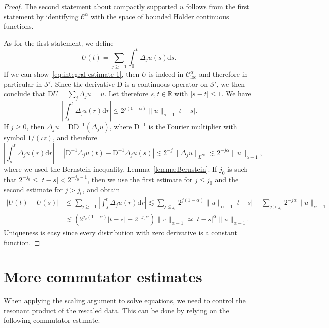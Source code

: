 \documentclass[a4paper,11pt]{article}
\newcommand{\mathD}{\mathrm{D}}
\newcommand{\mathd}{\mathrm{d}}
\newcommand{\tmop}[1]{\ensuremath{\operatorname{#1}}}
\theoremstyle{remark}
\newcommand{\CC}{\ensuremath{\mathscr{C}}}
\newcommand{\CS}{\ensuremath{\mathscr{S}}}
\begin{document}
\begin{proof}
  The second statement about compactly supported $u$ follows from the first statement by identifying $\CC^{\alpha}$ with the space of bounded H{\"o}lder continuous functions.
  
  As for the first statement, we define
  \[
     U ( t ) = \sum_{j \geqslant -1} \int_{0}^{t} \Delta_{j} u ( s ) \mathd s.
  \]
  If we can show~{\eqref{eq:integral estimate 1}}, then $U$ is indeed in $\CC^{\alpha}_{\tmop{loc}}$ and therefore in particular in $\CS'$. Since the derivative $\mathD$ is a continuous operator on $\CS'$, we then conclude that $\mathD U= \sum_{j} \Delta_{j} u=u$. Let therefore $s,t \in \mathbb{R}$ with $| s-t | \leqslant 1$. We have
  \[
     \left| \int_{s}^{t} \Delta_{j} u ( r ) \mathd r \right| \leqslant 2^{j (1- \alpha )} \| u \|_{\alpha -1} | t-s | .
  \]
  If $j \geqslant 0$, then $\Delta_{j} u= \mathD \mathD^{-1} ( \Delta_{j} u)$, where $\mathD^{-1}$ is the Fourier multiplier with symbol $1/ ( \iota  z )$, and therefore
  \[
     \left| \int_{s}^{t} \Delta_{j} u ( r ) \mathd r \right| = | \mathD^{-1} \Delta_{j} u ( t ) - \mathD^{-1} \Delta_{j} u ( s ) | \lesssim 2^{-j} \| \Delta_{j} u \|_{L^{\infty}} \lesssim 2^{-j \alpha} \| u \|_{\alpha -1} ,
  \]
  where we used the Bernstein inequality, Lemma~\ref{lemma:Bernstein}. If $j_{0}$ is such that $2^{-j_{0}} \leqslant | t-s | <2^{-j_{0} +1}$, then we use the first estimate for $j \leqslant j_{0}$ and the second estimate for $j>j_{0}$, and obtain
  \begin{align*}
     | U ( t ) -U ( s ) | &\leqslant \sum_{j \geqslant -1} \left| \int_{s}^{t} \Delta_{j} u ( r ) \mathd r \right| \lesssim \sum_{j \leqslant j_{0}} 2^{j ( 1- \alpha )} \| u \|_{\alpha -1} | t-s | + \sum_{j>j_{0}} 2^{-j \alpha} \| u \|_{\alpha -1} \\
     & \lesssim ( 2^{j_{0} ( 1- \alpha )} | t-s | +2^{-j_{0} \alpha} ) \| u \|_{\alpha -1} \simeq | t-s |^{\alpha} \| u \|_{\alpha -1} .
  \end{align*}
  Uniqueness is easy since every distribution with zero derivative is a constant function.
\end{proof}



\section{More commutator estimates}\label{sec:convolution commutators}

When applying the scaling argument to solve equations, we need to control the resonant product of the rescaled data. This can be done by relying on the following commutator estimate.
\end{document}
